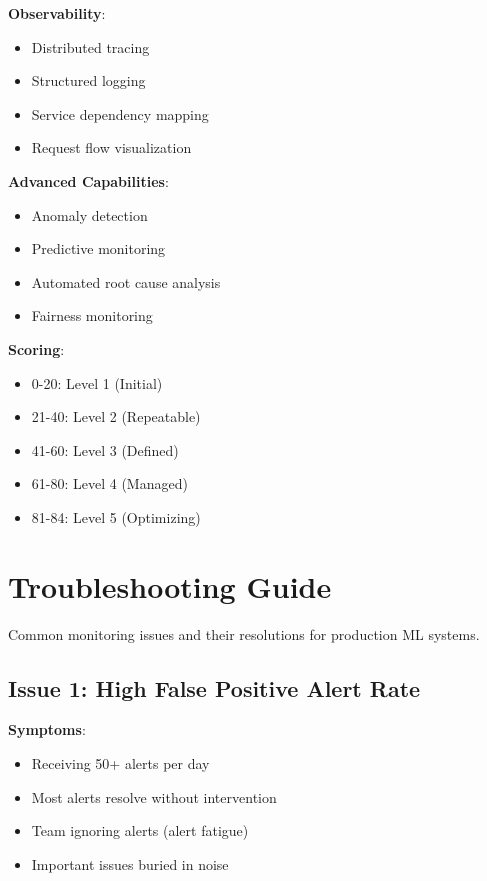 \textbf{Observability}:
\begin{itemize}
    \item [ ] Distributed tracing
    \item [ ] Structured logging
    \item [ ] Service dependency mapping
    \item [ ] Request flow visualization
\end{itemize}

\textbf{Advanced Capabilities}:
\begin{itemize}
    \item [ ] Anomaly detection
    \item [ ] Predictive monitoring
    \item [ ] Automated root cause analysis
    \item [ ] Fairness monitoring
\end{itemize}

\textbf{Scoring}:
\begin{itemize}
    \item 0-20: Level 1 (Initial)
    \item 21-40: Level 2 (Repeatable)
    \item 41-60: Level 3 (Defined)
    \item 61-80: Level 4 (Managed)
    \item 81-84: Level 5 (Optimizing)
\end{itemize}

\section{Troubleshooting Guide}

Common monitoring issues and their resolutions for production ML systems.

\subsection{Issue 1: High False Positive Alert Rate}

\textbf{Symptoms}:
\begin{itemize}
    \item Receiving 50+ alerts per day
    \item Most alerts resolve without intervention
    \item Team ignoring alerts (alert fatigue)
    \item Important issues buried in noise
\end{itemize}


